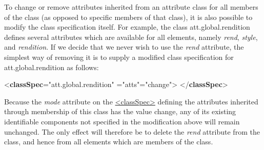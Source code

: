 To change or remove attributes inherited from an attribute class for all members of the class (as opposed to specific members of that class), it is also possible to modify the class specification itself. For example, the class \textsf{att.global.rendition} defines several attributes which are available for all elements, namely {\itshape rend}, {\itshape style}, and {\itshape rendition}. If we decide that we never wish to use the {\itshape rend} attribute, the simplest way of removing it is to supply a modified class specification for \textsf{att.global.rendition} as follows: \par\bgroup{}\exampleFont \begin{shaded}\noindent\mbox{}{<\textbf{classSpec}\hspace*{1em}{ident}="{att.global.rendition}"\mbox{}\newline 
\hspace*{1em}{type}="{atts}"\hspace*{1em}{mode}="{change}">}\mbox{}\newline 
{}\mbox{}\newline 
\hspace*{1em}\mbox{}\newline 
{}\mbox{}\newline 
{</\textbf{classSpec}>}\end{shaded}\egroup\par \noindent  Because the {\itshape mode} attribute on the \hyperref[TEI.classSpec]{<classSpec>} defining the attributes inherited through membership of this class has the value change, any of its existing identifiable components not specified in the modification above will remain unchanged. The only effect will therefore be to delete the {\itshape rend} attribute from the class, and hence from all elements which are members of the class.\par

